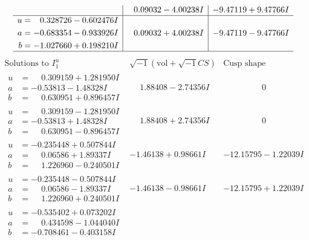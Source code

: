 \documentclass[1p]{elsarticle_modified}
\theoremstyle{definition}
\newcommand{\I}{\sqrt{-1}}
\begin{document}
$$\begin{array}{c|c|c}
 & \phantom{-}0.09032 - 4.00238 I & -9.47119 + 9.47766 I \\ \hline\begin{aligned}
u &= \phantom{-}0.328726 - 0.602476 I \\
a &= -0.683354 - 0.933926 I \\
b &= -1.027660 + 0.198210 I\end{aligned}
 & \phantom{-}0.09032 + 4.00238 I & -9.47119 - 9.47766 I\\
 \hline 
 \end{array}$$\newpage$$\begin{array}{c|c|c}  
\text{Solutions to }I^u_{1}& \I (\text{vol} + \sqrt{-1}CS) & \text{Cusp shape}\\
 \hline 
\begin{aligned}
u &= \phantom{-}0.309159 + 1.281950 I \\
a &= -0.53813 - 1.48328 I \\
b &= \phantom{-}0.630951 + 0.896457 I\end{aligned}
 & \phantom{-}1.88408 - 2.74356 I & \phantom{-0.000000 } 0 \\ \hline\begin{aligned}
u &= \phantom{-}0.309159 - 1.281950 I \\
a &= -0.53813 + 1.48328 I \\
b &= \phantom{-}0.630951 - 0.896457 I\end{aligned}
 & \phantom{-}1.88408 + 2.74356 I & \phantom{-0.000000 } 0 \\ \hline\begin{aligned}
u &= -0.235448 + 0.507844 I \\
a &= \phantom{-}0.06586 + 1.89337 I \\
b &= \phantom{-}1.226960 - 0.240501 I\end{aligned}
 & -1.46138 + 0.98661 I & -12.15795 - 1.22039 I \\ \hline\begin{aligned}
u &= -0.235448 - 0.507844 I \\
a &= \phantom{-}0.06586 - 1.89337 I \\
b &= \phantom{-}1.226960 + 0.240501 I\end{aligned}
 & -1.46138 - 0.98661 I & -12.15795 + 1.22039 I \\ \hline\begin{aligned}
u &= -0.535402 + 0.073202 I \\
a &= \phantom{-}0.434598 - 1.044040 I \\
b &= -0.708461 - 0.403158 I\end{aligned}

\end{array}$$
\end{document}
